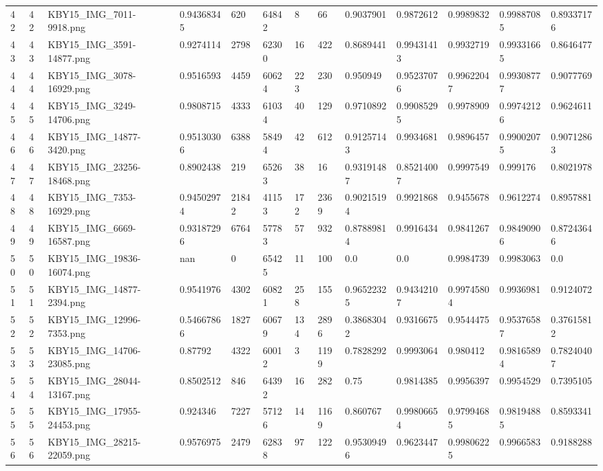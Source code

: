 \documentclass[11pt, a4paper, twoside]{report}
\begin{document}
\begin{longtable}[c]{@{}lllllllllllll@{}}
42 & 42 & KBY15\_IMG\_7011-9918.png & 0.94368345 & 620 & 64842 & 8 & 66 & 0.9037901 & 0.9872612 & 0.9989832 & 0.99887085 & 0.89337176 \\
43 & 43 & KBY15\_IMG\_3591-14877.png & 0.9274114 & 2798 & 62300 & 16 & 422 & 0.8689441 & 0.99431413 & 0.9932719 & 0.99331665 & 0.8646477 \\
44 & 44 & KBY15\_IMG\_3078-16929.png & 0.9516593 & 4459 & 60624 & 223 & 230 & 0.950949 & 0.95237076 & 0.99622047 & 0.99308777 & 0.9077769 \\
45 & 45 & KBY15\_IMG\_3249-14706.png & 0.9808715 & 4333 & 61034 & 40 & 129 & 0.9710892 & 0.99085295 & 0.9978909 & 0.99742126 & 0.9624611 \\
46 & 46 & KBY15\_IMG\_14877-3420.png & 0.95130306 & 6388 & 58494 & 42 & 612 & 0.91257143 & 0.9934681 & 0.9896457 & 0.99002075 & 0.90712863 \\
47 & 47 & KBY15\_IMG\_23256-18468.png & 0.8902438 & 219 & 65263 & 38 & 16 & 0.93191487 & 0.85214007 & 0.9997549 & 0.999176 & 0.8021978 \\
48 & 48 & KBY15\_IMG\_7353-16929.png & 0.94502974 & 21842 & 41153 & 172 & 2369 & 0.90215194 & 0.9921868 & 0.9455678 & 0.9612274 & 0.8957881 \\
49 & 49 & KBY15\_IMG\_6669-16587.png & 0.93187296 & 6764 & 57783 & 57 & 932 & 0.87889814 & 0.9916434 & 0.9841267 & 0.98490906 & 0.87243646 \\
50 & 50 & KBY15\_IMG\_19836-16074.png & nan & 0 & 65425 & 11 & 100 & 0.0 & 0.0 & 0.9984739 & 0.9983063 & 0.0 \\
51 & 51 & KBY15\_IMG\_14877-2394.png & 0.9541976 & 4302 & 60821 & 258 & 155 & 0.96522325 & 0.94342107 & 0.99745804 & 0.9936981 & 0.9124072 \\
52 & 52 & KBY15\_IMG\_12996-7353.png & 0.54667866 & 1827 & 60679 & 134 & 2896 & 0.38683042 & 0.9316675 & 0.9544475 & 0.95376587 & 0.37615812 \\
53 & 53 & KBY15\_IMG\_14706-23085.png & 0.87792 & 4322 & 60012 & 3 & 1199 & 0.7828292 & 0.9993064 & 0.980412 & 0.98165894 & 0.78240407 \\
54 & 54 & KBY15\_IMG\_28044-13167.png & 0.8502512 & 846 & 64392 & 16 & 282 & 0.75 & 0.9814385 & 0.9956397 & 0.9954529 & 0.7395105 \\
55 & 55 & KBY15\_IMG\_17955-24453.png & 0.924346 & 7227 & 57126 & 14 & 1169 & 0.860767 & 0.99806654 & 0.97994685 & 0.98194885 & 0.8593341 \\
56 & 56 & KBY15\_IMG\_28215-22059.png & 0.9576975 & 2479 & 62838 & 97 & 122 & 0.95309496 & 0.9623447 & 0.99806225 & 0.9966583 & 0.9188288 \\

\end{longtable}
\end{document}

